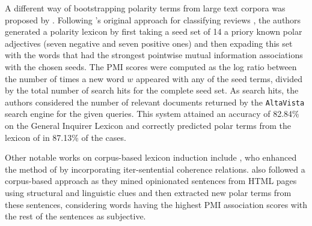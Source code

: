 A different way of bootstrapping polarity terms from large text
corpora was proposed by \citet{Turney:03}.  Following
\citeauthor{Turney:02}'s original approach for classifying reviews
\citep{Turney:02}, the authors generated a polarity lexicon by first
taking a seed set of 14 a priory known polar adjectives (seven
negative and seven positive ones) and then expading this set with the
words that had the strongest pointwise mutual information associations
with the chosen seeds.  The PMI scores were computed as the log ratio
between the number of times a new word $w$ appeared with any of the
seed terms, divided by the total number of search hits for the
complete seed set.  As search hits, the authors considered the number
of relevant documents returned by the \texttt{AltaVista} search engine
for the given queries.  This system attained an accuracy of 82.84\% on
the General Inquirer Lexicon \citep{Stone:66} and correctly predicted
polar terms from the lexicon of \cite{Hatzivassi:97} in 87.13\% of the
cases. %

Other notable works on corpus-based lexicon induction include
\citet{Kanayama:06}, who enhanced the method of
\citeauthor{Hatzivassi:97} by incorporating iter-sentential coherence
relations.  \citet{Kaji:07} also followed a corpus-based approach as
they mined opinionated sentences from HTML pages using structural and
linguistic clues and then extracted new polar terms from these
sentences, considering words having the highest PMI association scores
with the rest of the sentences as subjective.



